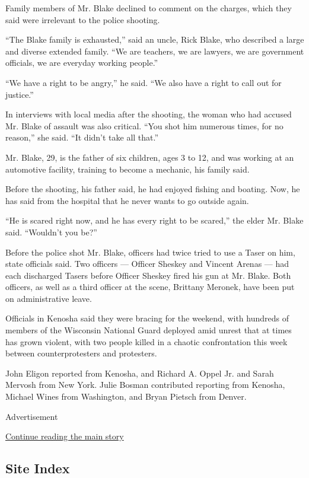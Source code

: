 Family members of Mr. Blake declined to comment on the charges, which
they said were irrelevant to the police shooting.

``The Blake family is exhausted,'' said an uncle, Rick Blake, who
described a large and diverse extended family. ``We are teachers, we are
lawyers, we are government officials, we are everyday working people.''

``We have a right to be angry,'' he said. ``We also have a right to call
out for justice.''

In interviews with local media after the shooting, the woman who had
accused Mr. Blake of assault was also critical. ``You shot him numerous
times, for no reason,'' she said. ``It didn't take all that.''

Mr. Blake, 29, is the father of six children, ages 3 to 12, and was
working at an automotive facility, training to become a mechanic, his
family said.

Before the shooting, his father said, he had enjoyed fishing and
boating. Now, he has said from the hospital that he never wants to go
outside again.

``He is scared right now, and he has every right to be scared,'' the
elder Mr. Blake said. ``Wouldn't you be?''

Before the police shot Mr. Blake, officers had twice tried to use a
Taser on him, state officials said. Two officers --- Officer Sheskey and
Vincent Arenas --- had each discharged Tasers before Officer Sheskey
fired his gun at Mr. Blake. Both officers, as well as a third officer at
the scene, Brittany Meronek, have been put on administrative leave.

Officials in Kenosha said they were bracing for the weekend, with
hundreds of members of the Wisconsin National Guard deployed amid unrest
that at times has grown violent, with two people killed in a chaotic
confrontation this week between counterprotesters and protesters.

John Eligon reported from Kenosha, and Richard A. Oppel Jr. and Sarah
Mervosh from New York. Julie Bosman contributed reporting from Kenosha,
Michael Wines from Washington, and Bryan Pietsch from Denver.

Advertisement

\protect\hyperlink{after-bottom}{Continue reading the main story}

\hypertarget{site-index}{%
\subsection{Site Index}\label{site-index}}

